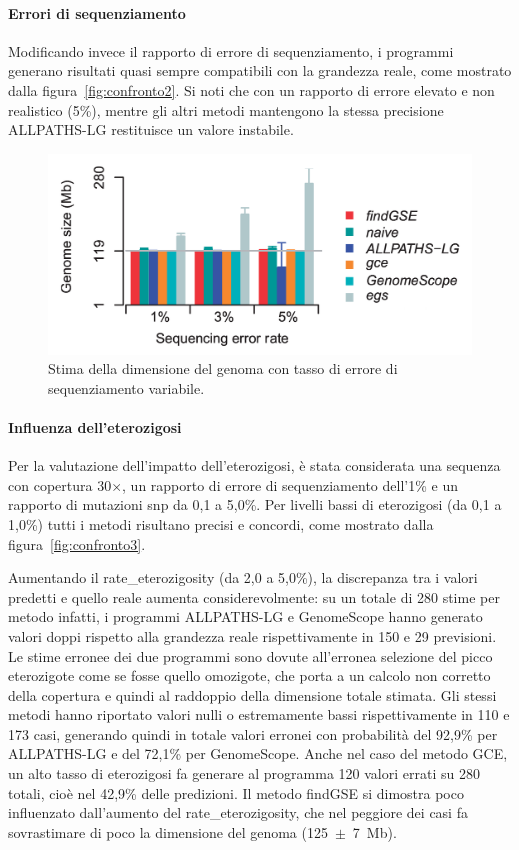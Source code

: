 \documentclass[crop=false, class=book]{standalone}
\begin{document}
	\paragraph{Errori di sequenziamento}
	Modificando invece il rapporto di errore di sequenziamento, i programmi generano risultati quasi sempre compatibili con la grandezza reale, come mostrato dalla figura~\vref{fig:confronto2}. Si noti che con un rapporto di errore elevato e non realistico (5\%), mentre gli altri metodi mantengono la stessa precisione ALLPATHS-LG restituisce un valore instabile.
	
	\begin{figure}
		\centering
		\includegraphics[height=0.21\textheight]{capitoli/analisi/confronto/confronto1/c.png}
		\caption{Stima della dimensione del genoma con tasso di errore di sequenziamento variabile.}
		\label{fig:confronto2}
	\end{figure}

	\paragraph{Influenza dell'eterozigosi}
	Per la valutazione dell'impatto dell'eterozigosi, è stata considerata una sequenza con copertura 30$\times$, un rapporto di errore di sequenziamento dell'1\% e un rapporto di mutazioni \gls{snp} da 0,1 a 5,0\%. Per livelli bassi di eterozigosi (da 0,1 a 1,0\%) tutti i metodi risultano precisi e concordi, come mostrato dalla figura~\ref{fig:confronto3}. 
	
	Aumentando il \gls{rate_eterozigosity} (da 2,0 a 5,0\%), la discrepanza tra i valori predetti e quello reale aumenta considerevolmente: su un totale di 280 stime per metodo infatti, i programmi ALLPATHS-LG e GenomeScope hanno generato valori doppi rispetto alla grandezza reale rispettivamente in 150 e 29 previsioni. Le stime erronee dei due programmi sono dovute all'erronea selezione del picco eterozigote come se fosse quello omozigote, che porta a un calcolo non corretto della copertura e quindi al raddoppio della dimensione totale stimata. Gli stessi metodi hanno riportato valori nulli o estremamente bassi rispettivamente in 110 e 173 casi, generando quindi in totale valori erronei con probabilità del 92,9\% per \mbox{ALLPATHS-LG} e del 72,1\% per \mbox{GenomeScope}. 
	Anche nel caso del metodo GCE, un alto tasso di eterozigosi fa generare al programma 120 valori errati su 280 totali, cioè nel 42,9\% delle predizioni. 
	Il metodo findGSE si dimostra poco influenzato dall'aumento del \gls{rate_eterozigosity}, che nel peggiore dei casi fa sovrastimare di poco la dimensione del genoma \mbox{(125 $\pm$ 7 Mb)}.
 
\end{document}
